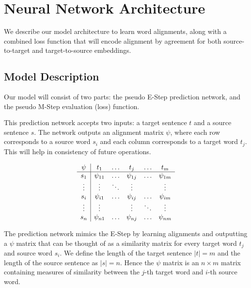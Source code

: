 \documentclass[twoside,twocolumn]{article}
\begin{document}

\section{Neural Network Architecture}

We describe our model architecture to learn word alignments, along with
a combined loss function that will encode alignment by
agreement for both source-to-target and target-to-source embeddings.



\subsection{Model Description}

Our model will consist of two parts: the pseudo E-Step prediction network, and
the pseudo M-Step evaluation (loss) function.

This prediction network accepts two inputs: a target sentence $t$ and a source
sentence $s$. The network outputs an alignment matrix $\psi$, where
each row corresponds to a source word $s_i$ and each column corresponds to a
target word $t_j$. This will help in consistency of future operations.

\begin{equation}
  \centering
\begin{array}{c|ccccc}
\psi & t_1       & \hdots & t_j       & \hdots & t_m       \\ \hline
s_1  & \psi_{11} & \hdots & \psi_{1j} & \hdots & \psi_{1m} \\
\vdots  & \vdots & \ddots & \vdots &  & \vdots \\
s_i  & \psi_{i1} & \hdots & \psi_{ij} & \hdots & \psi_{im} \\
\vdots  & \vdots &  & \vdots & \ddots & \vdots \\
s_n  & \psi_{n1} & \hdots & \psi_{nj} & \hdots & \psi_{nm}
\end{array}
\end{equation}

The prediction network mimics the E-Step by learning alignments and outputting
a $\psi$ matrix that can be thought of as a similarity matrix for every target
word $t_j$ and source word $s_i$. We define the length of the target sentence
$|t| = m$ and the length of the source sentence as $|s|=n$. Hence the $\psi$
matrix is an $n \times m$ matrix containing measures of similarity between the
$j$-th target word and $i$-th source word.
\end{document}
